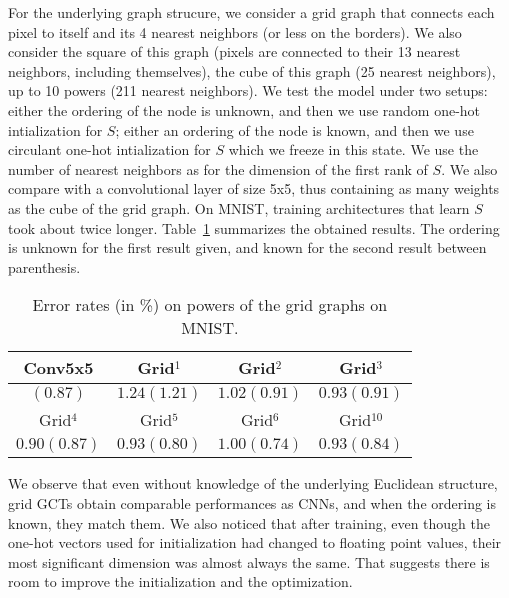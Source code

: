 For the underlying graph strucure, we consider a grid graph that connects each pixel to itself and its 4 nearest neighbors (or less on the borders). We also consider the square of this graph (pixels are connected to their 13 nearest neighbors, including themselves), the cube of this graph (25 nearest neighbors), up to 10 powers (211 nearest neighbors).
We test the model under two setups: either the ordering of the node is unknown, and then we use random one-hot intialization for $S$; either an ordering of the node is known, and then we use circulant one-hot intialization for $S$ which we freeze in this state. We use the number of nearest neighbors as for the dimension of the first rank of $S$.
We also compare with a convolutional layer of size 5x5, thus containing as many weights as the cube of the grid graph. On MNIST, training architectures that learn $S$ took about twice longer. Table~\ref{toy} summarizes the obtained results. The ordering is unknown for the first result given, and known for the second result between parenthesis.

\begin{table}[H]
  \caption{Error rates (in \%) on powers of the grid graphs on MNIST.}
  \begin{center}
    \bgroup
    \def\arraystretch{1.5}%
    \begin{tabular}{|c|c|c|c|}
      \hline
      Conv5x5 & Grid$^1$ & Grid$^2$ & Grid$^3$\\
      \hline
      $(0.87)$ & $1.24 (1.21)$ & $1.02 (0.91)$ & $0.93 (0.91)$\\
      \hline
      \hline
      Grid$^4$ & Grid$^5$ & Grid$^6$ & Grid$^{10}$\\
      \hline
      $0.90 (0.87)$ & $0.93 (0.80)$ & $1.00 (0.74)$ & $0.93 (0.84)$\\
      \hline
    \end{tabular}
    \egroup
  \end{center}
  \label{toy}
\end{table}

We observe that even without knowledge of the underlying Euclidean structure, grid GCTs obtain comparable performances as CNNs, and when the ordering is known, they match them. We also noticed that after training, even though the one-hot vectors used for initialization had changed to floating point values, their most significant dimension was almost always the same. That suggests there is room to improve the initialization and the optimization.

